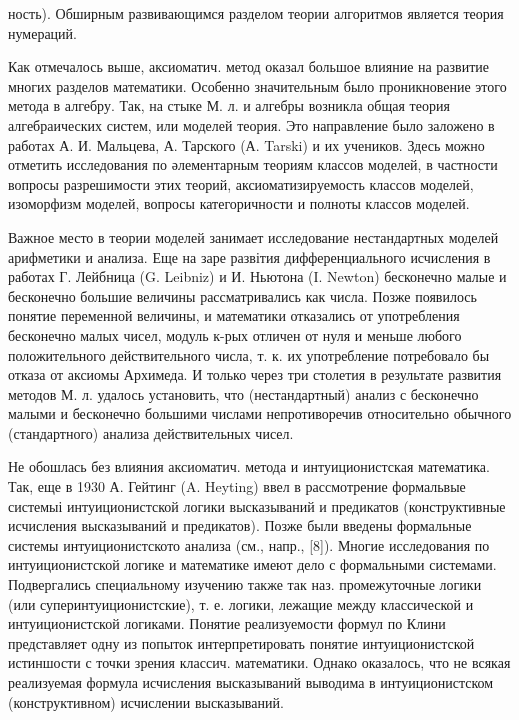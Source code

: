 \documentclass[10pt]{article}
\begin{document}
ность). Обширным развивающимся разделом теории алгоритмов является теория нумераций.



Как отмечалось выше, аксиоматич. метод оказал большое влияние на развитие многих разделов математики. Особенно значительным было проникновение этого метода в алгебру. Так, на стыке М. л. и алгебры возникла общая теория алгебраических систем, или моделей теория. Это направление было заложено в работах А. И. Мальцева, А. Тарского (А. Tarski) и их учеников. Здесь можно отметить исследования по әлементарным теориям классов моделей, в частности вопросы разрешимости этих теорий, аксиоматизируемость классов моделей, изоморфизм моделей, вопросы категоричности и полноты классов моделей.



Важное место в теории моделей занимает исследование нестандартных моделей арифметики и анализа. Еще на заре развітия дифференциального исчисления в работах Г. Лейбница (G. Leibniz) и И. Ньютона (I. Newton) бесконечно малые и бесконечно большие величины рассматривались как числа. Позже появилось понятие переменной величины, и математики отказались от употребления бесконечно малых чисел, модуль к-рых отличен от нуля и меньше любого положительного действительного числа, т. к. их употребление потребовало бы отказа от аксиомы Архимеда. И только через три столетия в результате развития методов М. л. удалось установить, что (нестандартный) анализ с бесконечно малыми и бесконечно большими числами непротиворечив относительно обычного (стандартного) анализа действительных чисел.



Не обошлась без влияния аксиоматич. метода и интуиционистская математика. Так, еще в 1930 А. Гейтинг (A. Heyting) ввел в рассмотрение формальвые системыі интуиционистской логики высказываний и предикатов (конструктивные исчисления высказываний и предикатов). Позже были введены формальные системы интуиционистското анализа (см., напр., [8]). Многие исследования по интуиционистской логике и математике имеют дело с формальными системами. Подвергались специальному изучению также так наз. промежуточные логики (или суперинтуиционистские), т. е. логики, лежащие между классической и интуиционистской логиками. Понятие реализуемости формул по Клини представляет одну из попыток интерпретировать понятие интуиционистской истиншости с точки зрения классич. математики. Однако оказалось, что не всякая реализуемая формула исчисления высказываний выводима в интуиционистском (конструктивном) исчислении высказываний.
\end{document}

